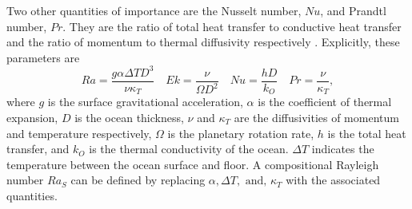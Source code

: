 \documentclass{article}
\begin{document}
Two other quantities of importance are the Nusselt number, $Nu$, and Prandtl number, $Pr$. 
They are the ratio of total heat transfer to conductive heat transfer and the ratio of momentum to thermal diffusivity respectively \citep{kS19}. 
Explicitly, these parameters are
\[Ra = \frac{g\alpha\Delta T D^{3}}{\nu\kappa_{T}}\quad Ek = \frac{\nu}{\Omega D^{2}} \quad Nu = \frac{hD}{k_{O}} \quad Pr= \frac{\nu}{\kappa_{T}},\]
where $g$ is the surface gravitational acceleration, $\alpha$ is the coefficient of thermal expansion, $D$ is the ocean thickness, $\nu$ and $\kappa_T$ are the diffusivities of momentum and temperature respectively, $\Omega$ is the planetary rotation rate, $h$ is the total heat transfer, and $k_O$ is the thermal conductivity of the ocean. $\Delta T$ indicates the temperature between the ocean surface and floor. 
A compositional Rayleigh number $Ra_{S}$ can be defined by replacing $\alpha, \Delta T,\text{ and, }\kappa_{T}$ with the associated quantities.
\end{document}
